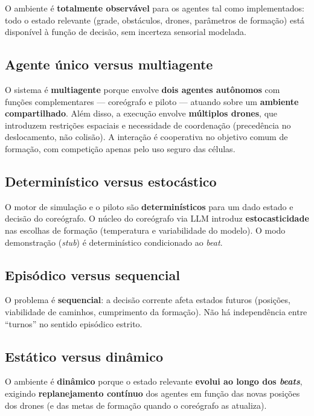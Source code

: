 \documentclass[12pt,a4paper,oneside]{article}
\begin{document}
O ambiente é \textbf{totalmente observável} para os agentes tal como implementados: todo o estado relevante (grade, obstáculos, drones, parâmetros de formação) está disponível à função de decisão, sem incerteza sensorial modelada.

\subsection{Agente único versus multiagente}

O sistema é \textbf{multiagente} porque envolve \textbf{dois agentes autônomos} com funções complementares --- coreógrafo e piloto --- atuando sobre um \textbf{ambiente compartilhado}. Além disso, a execução envolve \textbf{múltiplos drones}, que introduzem restrições espaciais e necessidade de coordenação (precedência no deslocamento, não colisão). A interação é cooperativa no objetivo comum de formação, com competição apenas pelo uso seguro das células.

\subsection{Determinístico versus estocástico}

O motor de simulação e o piloto são \textbf{determinísticos} para um dado estado e decisão do coreógrafo. O núcleo do coreógrafo via LLM introduz \textbf{estocasticidade} nas escolhas de formação (temperatura e variabilidade do modelo). O modo demonstração (\textit{stub}) é determinístico condicionado ao \textit{beat}.

\subsection{Episódico versus sequencial}

O problema é \textbf{sequencial}: a decisão corrente afeta estados futuros (posições, viabilidade de caminhos, cumprimento da formação). Não há independência entre ``turnos'' no sentido episódico estrito.

\subsection{Estático versus dinâmico}

O ambiente é \textbf{dinâmico} porque o estado relevante \textbf{evolui ao longo dos \textit{beats}}, exigindo \textbf{replanejamento contínuo} dos agentes em função das novas posições dos drones (e das metas de formação quando o coreógrafo as atualiza).
\end{document}
